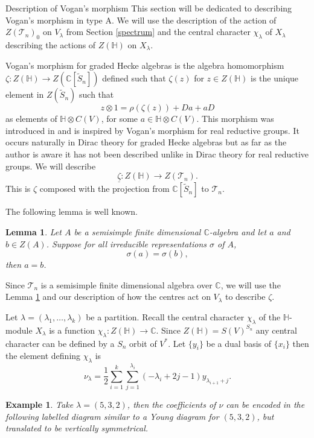 \documentclass[a4paper,10pt]{amsart}
\newtheorem{example}[theorem]{Example}
\newtheorem{lemma}[theorem]{Lemma}
\begin{document}
\begin{section}{Description of Vogan's morphism}\label{vogan}
This section will be dedicated to describing Vogan's morphism in type A. We will use the description of the action of $Z(\mathcal{T}_n)_0$ on $V_\lambda$ from Section \ref{spectrum} and the central character $\chi_\lambda$ of $X_\lambda$ describing the actions of $Z(\mathbb{H})$ on $X_\lambda$.

 Vogan's morphism for graded Hecke algebras is the algebra homomorphism $\zeta: Z(\mathbb{H}) \to Z(\mathbb{C}[\tilde{S}_n])$ defined such that $\zeta(z)$ for $z \in Z(\mathbb{H})$ is the unique element in $Z(\tilde{S}_n)$ such that $$z\otimes 1 = \rho (\zeta(z)) + Da + aD$$ as elements of $\mathbb{H} \otimes C(V)$, for some $a \in \mathbb{H}\otimes C(V)$. This morphism was introduced in \cite{BCT12} and is inspired by Vogan's morphism for real reductive groups. It occurs naturally in Dirac theory for graded Hecke algebras but as far as the author is aware it has not been described unlike in Dirac theory for real reductive groups.
 We will describe 
$$\underline{\zeta}: Z(\mathbb{H}) \to Z(\mathcal{T}_n).$$
This is $\zeta$ composed with the projection from $\mathbb{C}[\tilde{S}_n]$ to $\mathcal{T}_n$.

The following lemma is well known.
\begin{lemma}\label{density} Let $A$ be a semisimple finite dimensional $\mathbb{C}$-algebra and let $a$ and $b \in Z(A)$.
Suppose for all irreducible representations $\sigma$ of $A$, $$\sigma(a)=\sigma(b),$$
then $a = b$.
\end{lemma} 

Since $\mathcal{T}_n$ is a semisimple finite dimensional algebra over $\mathbb{C}$, we will use the Lemma \ref{density} and our description of how the centres act on $V_\lambda$ to describe $\zeta$. 





 Let $\lambda= (\lambda_1,\ldots ,\lambda_k)$ be a partition. Recall the central character $\chi_\lambda$ of the $\mathbb{H}$-module $X_\lambda$  is a function $\chi_\lambda: Z(\mathbb{H}) \to \mathbb{C}$. Since $Z(\mathbb{H}) = S(V)^{S_n}$ any central character can be defined by a $S_n$ orbit of $V^*$. Let $\{y_i\}$ be a dual basis of $\{x_i\}$ then the element defining $\chi_\lambda$ is 
 $$\nu_\lambda = \frac{1}{2} \sum_{i=1}^k \sum_{j =1}^{\lambda_i} (-\lambda_i +2j-1)y_{\lambda_{i+1}+j}.$$
 
 \begin{example} Take $\lambda = (5,3,2)$, then the coefficients of $\nu$ can be encoded in the following labelled diagram similar to a Young diagram for $(5,3,2)$, but translated to be vertically symmetrical.
 

\end{example}
\end{section}
\end{document}
